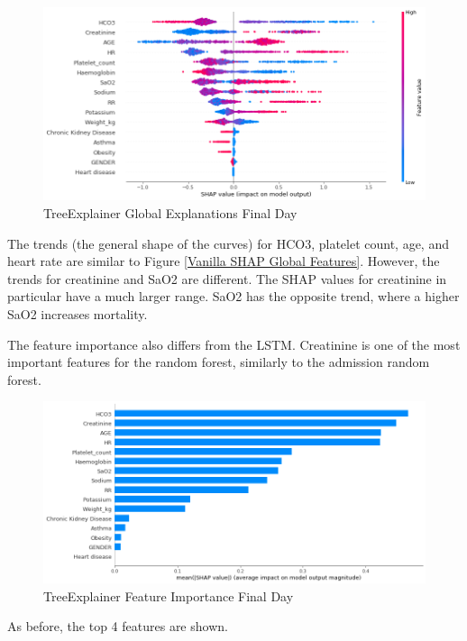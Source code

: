 \documentclass[12pt]{article}
\begin{document}
\begin{figure}[H]
\centering\caption{TreeExplainer Global Explanations Final Day}
\includegraphics[scale=0.5]{TreeExplainer Final1 Global/TreeExplainer Final1 Global.png}
\end{figure}
The trends (the general shape of the curves) for HCO3, platelet count, age, and heart rate are similar to Figure \ref{Vanilla SHAP Global Features}. However, the trends for creatinine and SaO2 are different. The SHAP values for creatinine in particular have a much larger range. SaO2 has the opposite trend, where a higher SaO2 increases mortality.

The feature importance also differs from the LSTM. Creatinine is one of the most important features for the random forest, similarly to the admission random forest.

\begin{figure}[H]
\centering\caption{TreeExplainer Feature Importance Final Day}
\includegraphics[scale=0.5]{TreeExplainer Final1 Global/TreeExplainer Final1 Feature Importance.png}
\end{figure}
As before, the top 4 features are shown.
\end{document}
